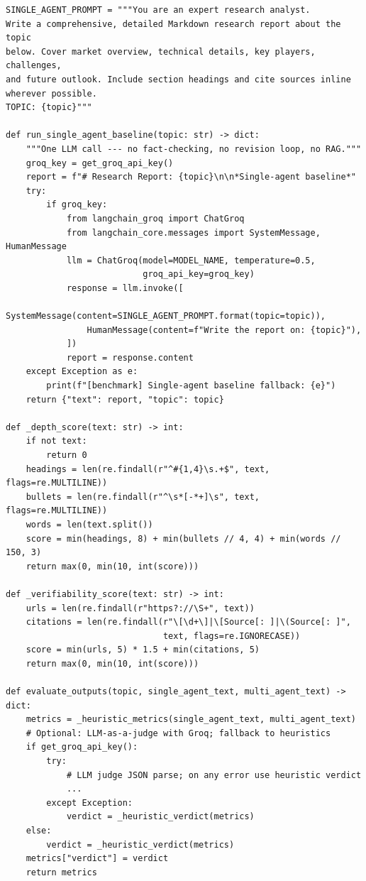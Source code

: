 \documentclass[11pt, a4paper]{article}
\begin{document}
\begin{lstlisting}[style=pythonstyle, caption={benchmark/evaluator.py --- Key Functions}]
SINGLE_AGENT_PROMPT = """You are an expert research analyst.
Write a comprehensive, detailed Markdown research report about the topic
below. Cover market overview, technical details, key players, challenges,
and future outlook. Include section headings and cite sources inline
wherever possible.
TOPIC: {topic}"""

def run_single_agent_baseline(topic: str) -> dict:
    """One LLM call --- no fact-checking, no revision loop, no RAG."""
    groq_key = get_groq_api_key()
    report = f"# Research Report: {topic}\n\n*Single-agent baseline*"
    try:
        if groq_key:
            from langchain_groq import ChatGroq
            from langchain_core.messages import SystemMessage, HumanMessage
            llm = ChatGroq(model=MODEL_NAME, temperature=0.5,
                           groq_api_key=groq_key)
            response = llm.invoke([
                SystemMessage(content=SINGLE_AGENT_PROMPT.format(topic=topic)),
                HumanMessage(content=f"Write the report on: {topic}"),
            ])
            report = response.content
    except Exception as e:
        print(f"[benchmark] Single-agent baseline fallback: {e}")
    return {"text": report, "topic": topic}

def _depth_score(text: str) -> int:
    if not text:
        return 0
    headings = len(re.findall(r"^#{1,4}\s.+$", text, flags=re.MULTILINE))
    bullets = len(re.findall(r"^\s*[-*+]\s", text, flags=re.MULTILINE))
    words = len(text.split())
    score = min(headings, 8) + min(bullets // 4, 4) + min(words // 150, 3)
    return max(0, min(10, int(score)))

def _verifiability_score(text: str) -> int:
    urls = len(re.findall(r"https?://\S+", text))
    citations = len(re.findall(r"\[\d+\]|\[Source[: ]|\(Source[: ]",
                               text, flags=re.IGNORECASE))
    score = min(urls, 5) * 1.5 + min(citations, 5)
    return max(0, min(10, int(score)))

def evaluate_outputs(topic, single_agent_text, multi_agent_text) -> dict:
    metrics = _heuristic_metrics(single_agent_text, multi_agent_text)
    # Optional: LLM-as-a-judge with Groq; fallback to heuristics
    if get_groq_api_key():
        try:
            # LLM judge JSON parse; on any error use heuristic verdict
            ...
        except Exception:
            verdict = _heuristic_verdict(metrics)
    else:
        verdict = _heuristic_verdict(metrics)
    metrics["verdict"] = verdict
    return metrics
\end{lstlisting}
\end{document}
